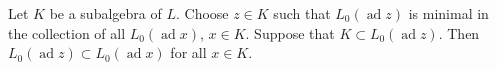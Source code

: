 Let $K$ be a subalgebra of $L$. Choose $z \in K$ such that $L_0(\operatorname{ad} z)$ is minimal in the collection of all $L_0(\operatorname{ad} x)$, $x \in K$. Suppose that $K \subset L_0(\operatorname{ad} z)$. Then $L_0(\operatorname{ad} z) \subset L_0(\operatorname{ad} x)$ for all $x \in K$.
